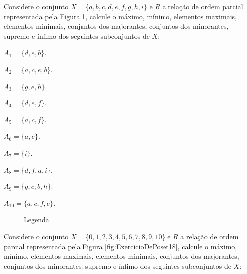 \begin{questao}\label{test:EquivalenciaOrdem17}
	Considere o conjunto $X = \{a, b, c, d, e, f, g, h, i\}$ e $R$ a relação de ordem parcial representada pela Figura \ref{fig:ExercicioDePoset17}, calcule o máximo, mínimo, elementos maximais, elementos minimais, conjuntos dos majorantes, conjuntos dos minorantes, supremo e ínfimo dos seguintes subconjuntos  de $X$:
\end{questao}

\begin{exerList}
	\item $A_1 = \{d, e, b\}$.
	\item $A_2= \{a, c, e, b\}$.
	\item $A_3 = \{g, e, h\}$.
	\item $A_4 = \{d, e, f\}$.
	\item $A_5 = \{a, c, f\}$.
	\item $A_6 = \{a, e\}$.
	\item $A_7 = \{i\}$.
	\item $A_8 = \{d, f, a, i\}$.
	\item $A_9 = \{g, c, b, h\}$.
	\item $A_{10} = \{a, c, f, e\}$.
\end{exerList}

\begin{figure}[h]
	\centering
	\caption{Legenda}
	\label{fig:ExercicioDePoset17}
\end{figure}

\begin{questao}\label{test:EquivalenciaOrdem18}
	Considere o conjunto $X = \{0, 1, 2, 3, 4, 5, 6, 7, 8, 9, 10\}$ e $R$ a relação de ordem parcial representada pela Figura \ref{fig:ExercicioDePoset18}, calcule o máximo, mínimo, elementos maximais, elementos minimais, conjuntos dos majorantes, conjuntos dos minorantes, supremo e ínfimo dos seguintes subconjuntos  de $X$:
\end{questao}

